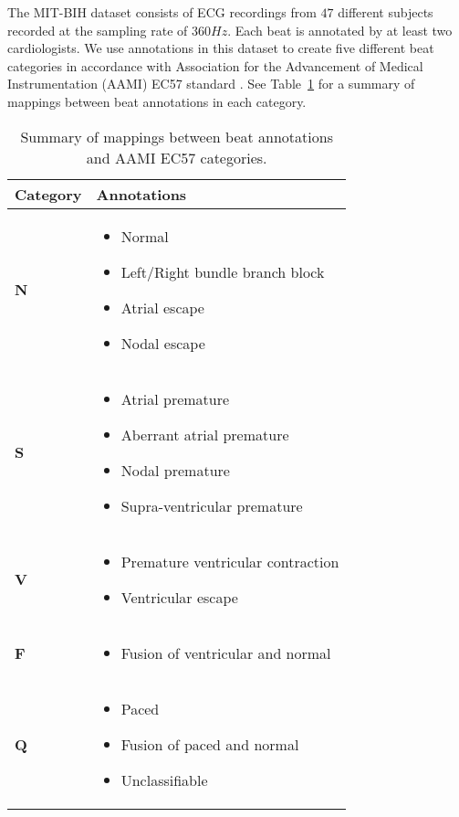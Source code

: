 \documentclass[10pt, conference, compsocconf]{IEEEtran}
\begin{document}
The MIT-BIH dataset consists of ECG recordings from $47$ different subjects recorded at the sampling rate of $360 Hz$. Each beat is annotated by at least two cardiologists. We use annotations in this dataset to create five different beat categories in accordance with Association for the Advancement of Medical Instrumentation (AAMI) EC57 standard \cite{association1998testing}. See Table~\ref{tab:aami} for a summary of mappings between beat annotations in each category.

\begin{table}[!t]
\renewcommand{\arraystretch}{1.3}
\caption{Summary of mappings between beat annotations and AAMI EC57 \cite{association1998testing} categories.}
\label{tab:aami}
\centering
\begin{tabular}{lp{2.0in}}
\hline
\textbf{Category} & \textbf{Annotations} \\
\hline
\hline
\textbf{N} & \begin{itemize} \item Normal \item Left/Right bundle branch block \item Atrial escape \item Nodal escape \end{itemize}\\
\hline
\textbf{S} & \begin{itemize} \item Atrial premature  \item Aberrant atrial premature \item Nodal premature \item Supra-ventricular premature \end{itemize}\\
\hline
\textbf{V} & \begin{itemize} \item Premature ventricular contraction \item Ventricular escape \end{itemize}\\
\hline
\textbf{F} & \begin{itemize} \item Fusion of ventricular and normal \end{itemize}\\
\hline
\textbf{Q} & \begin{itemize}
    \item Paced \item Fusion of paced and normal \item Unclassifiable \end{itemize}\\
\hline
\end{tabular}
\end{table}
\end{document}
